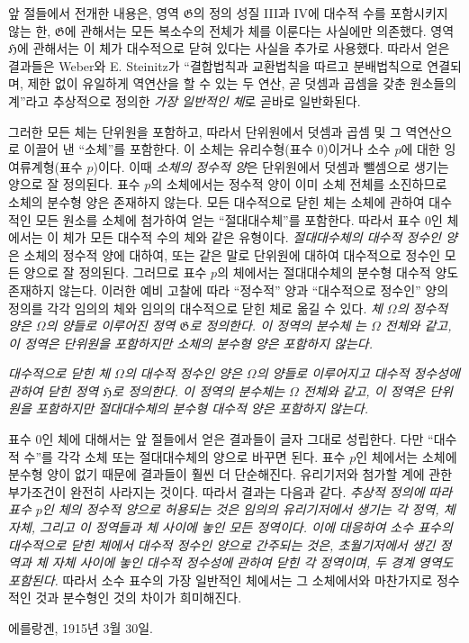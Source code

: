 앞 절들에서 전개한 내용은, 영역 $\mathfrak G$의 정의 성질 III과 IV에 대수적 수를 포함시키지 않는 한, $\mathfrak G$에 관해서는 모든 복소수의 전체가 체를 이룬다는 사실에만 의존했다. 영역 $\mathfrak H$에 관해서는 이 체가 대수적으로 닫혀 있다는 사실을 추가로 사용했다. 따라서 얻은 결과들은 Weber와 E. Steinitz가 ``결합법칙과 교환법칙을 따르고 분배법칙으로 연결되며, 제한 없이 유일하게 역연산을 할 수 있는 두 연산, 곧 덧셈과 곱셈을 갖춘 원소들의 계''라고 추상적으로 정의한 \emph{가장 일반적인 체}로 곧바로 일반화된다.

그러한 모든 체는 단위원을 포함하고, 따라서 단위원에서 덧셈과 곱셈 및 그 역연산으로 이끌어 낸 ``소체''를 포함한다. 이 소체는 유리수형(표수 0)이거나 소수 $p$에 대한 잉여류계형(표수 $p$)이다. 이때 \emph{소체의 정수적 양}은 단위원에서 덧셈과 뺄셈으로 생기는 양으로 잘 정의된다. 표수 $p$의 소체에서는 정수적 양이 이미 소체 전체를 소진하므로 소체의 분수형 양은 존재하지 않는다. 모든 대수적으로 닫힌 체는 소체에 관하여 대수적인 모든 원소를 소체에 첨가하여 얻는 ``절대대수체''를 포함한다. 따라서 표수 0인 체에서는 이 체가 모든 대수적 수의 체와 같은 유형이다. \emph{절대대수체의 대수적 정수인 양}은 소체의 정수적 양에 대하여, 또는 같은 말로 단위원에 대하여 대수적으로 정수인 모든 양으로 잘 정의된다. 그러므로 표수 $p$의 체에서는 절대대수체의 분수형 대수적 양도 존재하지 않는다. 이러한 예비 고찰에 따라 ``정수적'' 양과 ``대수적으로 정수인'' 양의 정의를 각각 임의의 체와 임의의 대수적으로 닫힌 체로 옮길 수 있다. \emph{체 $\Omega$의 정수적 양은 $\Omega$의 양들로 이루어진 정역 $\mathfrak G$로 정의한다. 이 정역의 분수체} \emph{는 $\Omega$ 전체와 같고, 이 정역은 단위원을 포함하지만 소체의 분수형 양은 포함하지 않는다.}

\emph{대수적으로 닫힌 체 $\Omega$의 대수적 정수인 양은 $\Omega$의 양들로 이루어지고 대수적 정수성에 관하여 닫힌 정역 $\mathfrak H$로 정의한다. 이 정역의 분수체는 $\Omega$ 전체와 같고, 이 정역은 단위원을 포함하지만 절대대수체의 분수형 대수적 양은 포함하지 않는다.}

표수 0인 체에 대해서는 앞 절들에서 얻은 결과들이 글자 그대로 성립한다. 다만 ``대수적 수''를 각각 소체 또는 절대대수체의 양으로 바꾸면 된다. 표수 $p$인 체에서는 소체에 분수형 양이 없기 때문에 결과들이 훨씬 더 단순해진다. 유리기저와 첨가할 계에 관한 부가조건이 완전히 사라지는 것이다. 따라서 결과는 다음과 같다. \emph{추상적 정의에 따라 표수 $p$인 체의 정수적 양으로 허용되는 것은 임의의 유리기저에서 생기는 각 정역, 체 자체, 그리고 이 정역들과 체 사이에 놓인 모든 정역이다. 이에 대응하여 소수 표수의 대수적으로 닫힌 체에서 대수적 정수인 양으로 간주되는 것은, 초월기저에서 생긴 정역과 체 자체 사이에 놓인 대수적 정수성에 관하여 닫힌 각 정역이며, 두 경계 영역도 포함된다.} 따라서 소수 표수의 가장 일반적인 체에서는 그 소체에서와 마찬가지로 정수적인 것과 분수형인 것의 차이가 희미해진다.

\medskip
\noindent 에를랑겐, 1915년 3월 30일.
